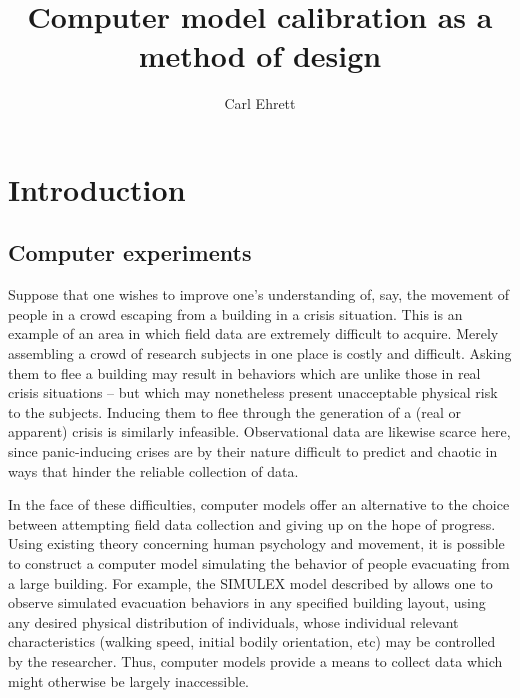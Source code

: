 \documentclass{article}
\author{Carl Ehrett}
\title{Computer model calibration as a method of design}
\begin{document}
\maketitle

\section{Introduction} \label{introduction}

\subsection{Computer experiments} \label{computer_experiments}

Suppose that one wishes to improve one's understanding of, say, the movement of people in a crowd escaping from a building in a crisis situation. This is an example of an area in which field data are extremely difficult to acquire. Merely assembling a crowd of research subjects in one place is costly and difficult. Asking them to flee a building may result in behaviors which are unlike those in real crisis situations -- but which may nonetheless present unacceptable physical risk to the subjects. Inducing them to flee through the generation of a (real or apparent) crisis is similarly infeasible. Observational data are likewise scarce here, since panic-inducing crises are by their nature difficult to predict and chaotic in ways that hinder the reliable collection of data.

In the face of these difficulties, computer models offer an alternative to the choice between attempting field data collection and giving up on the hope of progress. Using existing theory concerning human psychology and movement, it is possible to construct a computer model simulating the behavior of people evacuating from a large building. For example, the SIMULEX model described by \cite{Thompson1995} allows one to observe simulated evacuation behaviors in any specified building layout, using any desired physical distribution of individuals, whose individual relevant characteristics (walking speed, initial bodily orientation, etc) may be controlled by the researcher. Thus, computer models provide a means to collect data which might otherwise be largely inaccessible. 
\end{document}
